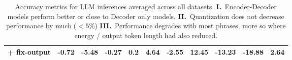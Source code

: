 \begin{table*}[!t]
\begin{center}
\begin{tabular}{|c||c|c|c|c||c|c|c|c|c|c|}
        + fix-output & -0.72 & -5.48 & -0.27 & 0.2 & 4.64 & -2.55 & 12.45 & -13.23 & -18.88 & 2.64\\
        \hline
        \end{tabular}
        \caption{Accuracy metrics for LLM inferences averaged across all datasets. 
        \textbf{I.}~Encoder-Decoder models perform better or close to Decoder only models.
        \textbf{II.}~Quantization does not decrease performance by much ($<5\%$)
        \textbf{III.}~Performance degrades with most phrases, more so where energy / output token length had also reduced. 
        }%
        \label{tab:metrics}
    \end{center}
\end{table*}


